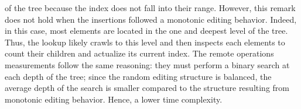 \begin{asparadesc}
  of the tree because the index does not fall into their range. However, this
  remark does not hold when the insertions followed a monotonic editing
  behavior. Indeed, in this case, most elements are located in the one and
  deepest level of the tree. Thus, the lookup likely crawls to this level and
  then inspects each elements to count their children and actualize its current
  index. The remote operations measurements follow the same reasoning: they must
  perform a binary search at each depth of the tree; since the random editing
  structure is balanced, the average depth of the search is smaller compared to
  the structure resulting from monotonic editing behavior. Hence, a lower time
  complexity.
\end{asparadesc}



